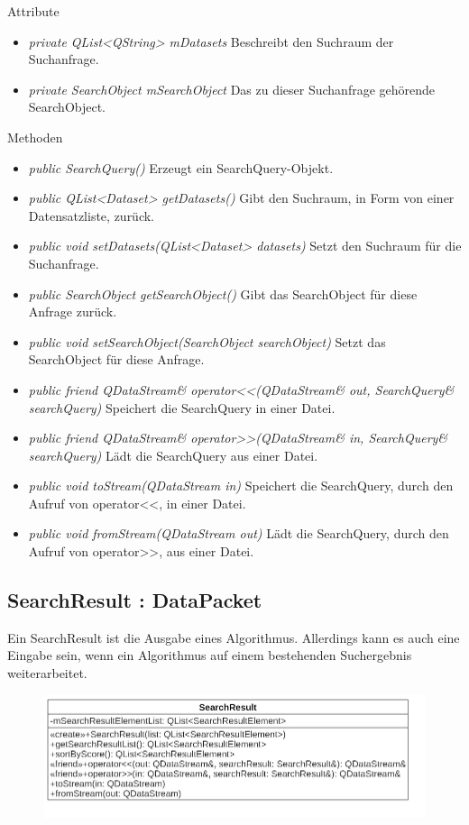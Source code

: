 Attribute
\begin{itemize}
\item\textit{private QList<QString> mDatasets} Beschreibt den Suchraum der Suchanfrage.
\item\textit{private SearchObject mSearchObject} Das zu dieser Suchanfrage gehörende SearchObject.
\end{itemize}

Methoden
\begin{itemize}
\item \textit{public SearchQuery()} Erzeugt ein SearchQuery-Objekt.
\item \textit{public QList<Dataset> getDatasets()} Gibt den Suchraum, in Form von einer Datensatzliste, zurück.
\item \textit{public void setDatasets(QList<Dataset> datasets)} Setzt den Suchraum für die Suchanfrage.
\item \textit{public SearchObject getSearchObject()} Gibt das SearchObject für diese Anfrage zurück.
\item \textit{public void setSearchObject(SearchObject searchObject)} Setzt das SearchObject für diese Anfrage.
\item \textit{public friend QDataStream\& operator<<(QDataStream\& out, SearchQuery\& searchQuery)} Speichert die SearchQuery in einer Datei.
\item \textit{public friend QDataStream\& operator>>(QDataStream\& in, SearchQuery\& searchQuery)} Lädt die SearchQuery aus einer Datei.
\item \textit{public void toStream(QDataStream in)} Speichert die SearchQuery, durch den Aufruf von operator<<, in einer Datei.
\item \textit{public void fromStream(QDataStream out)} Lädt die SearchQuery, durch den Aufruf von operator>>, aus einer Datei.
\end{itemize}

\subsection*{SearchResult : DataPacket}
Ein SearchResult ist die Ausgabe eines Algorithmus. Allerdings kann es auch eine Eingabe sein, wenn ein Algorithmus auf einem bestehenden Suchergebnis weiterarbeitet.

\begin{figure}[H]
\centering
\includegraphics[scale=0.5]{img/Klassendiagramm/Klassen/Model/SearchResult}
\label{fig:searchResult}
\end{figure}

